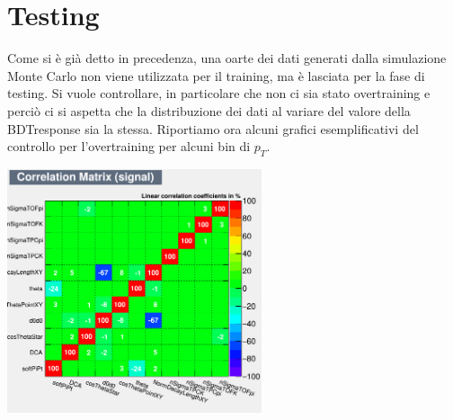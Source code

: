  
 
 
 
 \section{Testing}
 
 Come si è già detto in precedenza, una oarte dei dati generati dalla simulazione Monte Carlo non viene utilizzata per il training, ma è lasciata per la fase di testing. Si vuole controllare, in particolare che non ci sia stato overtraining e perciò ci si aspetta che la distribuzione dei dati al variare del valore della BDTresponse sia la stessa. Riportiamo ora alcuni grafici esemplificativi del controllo per l'overtraining per alcuni bin di $p_T$.
 
 
    \begin{minipage}{.5\textwidth}%
        \begin{flushleft} \large
        \flushleft
        \includegraphics[width=7.5cm]{training&testing/CorrelationMatrixS.png}
        \label{fig:testing_3_4}
        \end{flushleft}
        \end{minipage}
    ~
